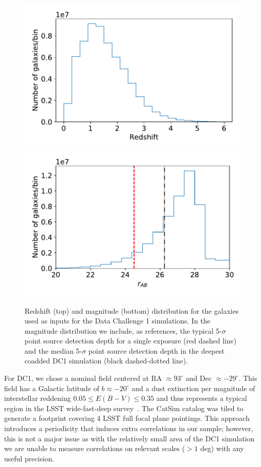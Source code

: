 \documentclass[a4paper,fleqn,usenatbib]{mnras}
\begin{document}
\begin{figure}
\centering
\includegraphics[width=0.9\columnwidth]{N_z_DC1.pdf}
\includegraphics[width=0.9\columnwidth]{N_m_DC1.pdf}
\caption{Redshift (top) and magnitude (bottom) distribution for the galaxies used as inputs for the Data Challenge 1 simulations. In the magnitude distribution we include, as references, the typical 5-$\sigma$ point source detection depth for a single exposure (red dashed line) and the median 5-$\sigma$ point source detection depth in the deepest coadded DC1 simulation (black dashed-dotted line).}
\label{fig:catalog_plots}
\end{figure}


For DC1, we chose a nominal field centered at RA $\approx 93^{\circ}$ and Dec $\approx -29^{\circ}$. This field has a Galactic latitude of $b \approx -20^{\circ}$ and a dust extinction per magnitude of interstellar reddening $0.05 \leq E(B-V) \leq 0.35$ and thus represents a typical region in the LSST wide-fast-deep survey~\citep{Overview}. The CatSim catalog was tiled to generate a footprint covering 4 LSST full focal plane pointings. This approach introduces a periodicity that induces extra correlations in our sample; however, this is not a major issue as with the relatively small area of the DC1 simulation we are unable to measure correlations on relevant scales ($> 1$ deg) with any useful precision.
\end{document}
